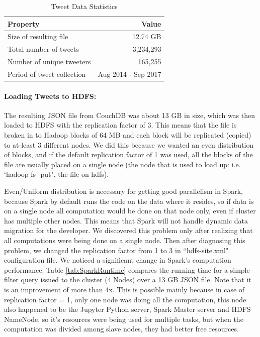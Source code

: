 \documentclass[12pt]{report}
\theoremstyle{named}
\begin{document}
\begin{table}[ht]
\centering
\begin{tabular}{@{}lr@{}}
\toprule
\textbf{Property}          & \textbf{Value}      \\ \midrule
Size of resulting file     & 12.74 GB            \\
Total number of tweets     & 3,234,293             \\
Number of unique tweeters  & 165,255              \\
Period of tweet collection & Aug 2014 - Sep 2017 \\ \bottomrule
\end{tabular}
\caption{Tweet Data Statistics}
\label{tab:tweetdata}
\end{table}
\paragraph{Loading Tweets to HDFS:\\}
The resulting JSON file from CouchDB was about 13 GB in size, which was then loaded to HDFS with the replication factor of 3. This means that the file is broken in to Hadoop blocks of 64 MB and each block will be replicated (copied) to at-least 3 different nodes. We did this because we wanted an even distribution of blocks, and if the default replication factor of 1 was used, all the blocks of the file are usually placed on a single node (the node that is used to load up: i.e. `hadoop fs -put", the file on hdfs).

Even/Uniform distribution is necessary for getting good parallelism in Spark, because Spark by default runs the code on the data where it resides, so if data is on a single node all computation would be done on that node only, even if cluster has multiple other nodes. This means that Spark will not handle dynamic data migration for the developer. We discovered this problem only after realizing that all computations were being done on a single node. Then after diagnosing this problem, we changed the replication factor from 1 to 3 in ``hdfs-site.xml" configuration file. We noticed a significant change in Spark's computation performance. Table \ref{tab:SparkRuntime} compares the running time for a simple filter query issued to the cluster (4 Nodes) over a 13 GB JSON file. Note that it is an improvement of more than 4x. This is possible mainly because in case of replication factor = 1, only one node was doing all the computation, this node also happened to be the Jupyter Python server, Spark Master server and HDFS NameNode, so it's resources were being used for multiple tasks, but when the computation was divided among slave nodes, they had better free resources.
\end{document}
